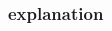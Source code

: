 \documentclass[notheorems, 8pt]{beamer}
\begin{document}
 
\begin{frame}
\frametitle{explanation}
\begin{columns}

\begin{column}{0.2\textwidth}
	
\end{column}
\begin{column}{0.2\textwidth}
	
	
	
	
\end{column}
\begin{column}{0.2\textwidth}
	
	
\end{column}
\begin{column}{0.2\textwidth}
	
	
\end{column}
\begin{column}{0.2\textwidth}
	
\end{column}
\end{columns}
\end{frame}
\end{document}
